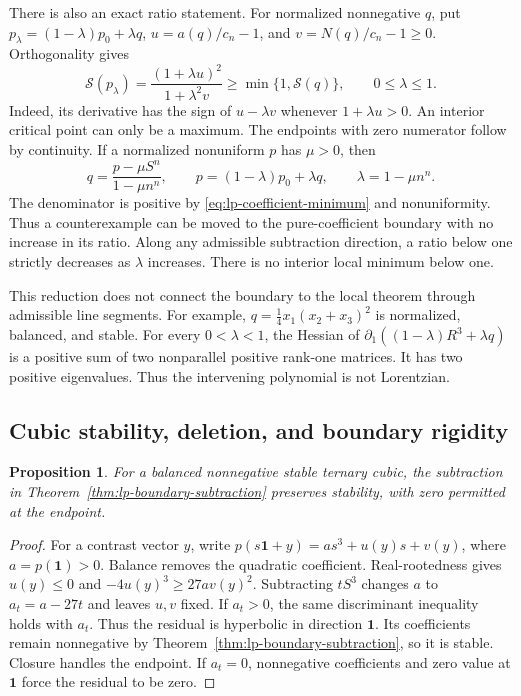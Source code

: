 \documentclass[11pt,a4paper]{article}
\newtheorem{proposition}[theorem]{Proposition}
\theoremstyle{definition}
\theoremstyle{remark}
\begin{document}
There is also an exact ratio statement.
For normalized nonnegative $q$, put $p_\lambda=(1-\lambda)p_0+\lambda q$,
$u=a(q)/c_n-1$, and $v=N(q)/c_n-1\ge0$.
Orthogonality gives
\begin{equation}\label{eq:lp-segment-ratio}
 \mathcal S(p_\lambda)=\frac{(1+\lambda u)^2}{1+\lambda^2v}
 \ge\min\{1,\mathcal S(q)\},\qquad 0\le\lambda\le1.
\end{equation}
Indeed, its derivative has the sign of $u-\lambda v$ whenever $1+\lambda u>0$.
An interior critical point can only be a maximum.
The endpoints with zero numerator follow by continuity.
If a normalized nonuniform $p$ has $\mu>0$, then
\[
 q=\frac{p-\mu S^n}{1-\mu n^n},\qquad
 p=(1-\lambda)p_0+\lambda q,\qquad \lambda=1-\mu n^n.
\]
The denominator is positive by \eqref{eq:lp-coefficient-minimum} and nonuniformity.
Thus a counterexample can be moved to the pure-coefficient boundary with no increase in its ratio.
Along any admissible subtraction direction, a ratio below one strictly decreases as $\lambda$ increases.
There is no interior local minimum below one.

This reduction does not connect the boundary to the local theorem through admissible line segments.
For example, $q=\tfrac14x_1(x_2+x_3)^2$ is normalized, balanced, and stable.
For every $0<\lambda<1$, the Hessian of
$\partial_1((1-\lambda)R^3+\lambda q)$ is a positive sum of two nonparallel positive rank-one matrices.
It has two positive eigenvalues.
Thus the intervening polynomial is not Lorentzian.

\subsection{Cubic stability, deletion, and boundary rigidity}

\begin{proposition}\label{prop:lp-cubic-subtraction}
For a balanced nonnegative stable ternary cubic, the subtraction in Theorem~\ref{thm:lp-boundary-subtraction} preserves stability, with zero permitted at the endpoint.
\end{proposition}
\begin{proof}
For a contrast vector $y$, write
$p(s\mathbf1+y)=as^3+u(y)s+v(y)$, where $a=p(\mathbf1)>0$.
Balance removes the quadratic coefficient.
Real-rootedness gives $u(y)\le0$ and $-4u(y)^3\ge27a v(y)^2$.
Subtracting $tS^3$ changes $a$ to $a_t=a-27t$ and leaves $u,v$ fixed.
If $a_t>0$, the same discriminant inequality holds with $a_t$.
Thus the residual is hyperbolic in direction $\mathbf1$.
Its coefficients remain nonnegative by Theorem~\ref{thm:lp-boundary-subtraction}, so it is stable.
Closure handles the endpoint.
If $a_t=0$, nonnegative coefficients and zero value at $\mathbf1$ force the residual to be zero.
\end{proof}
\end{document}
